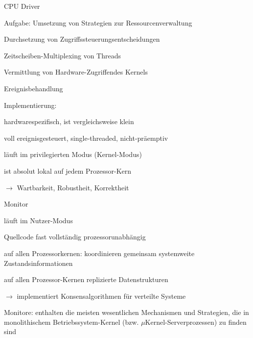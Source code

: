 \documentclass[a4paper]{article}
\begin{document}
\begin{multicols}{3}
    CPU Driver
    \begin{itemize*}
        \item Aufgabe: Umsetzung von Strategien zur Ressourcenverwaltung
        \begin{itemize*}
            \item Durchsetzung von Zugriffssteuerungsentscheidungen
            \item Zeitscheiben-Multiplexing von Threads
            \item Vermittlung von Hardware-Zugriffendes Kernels
            \item Ereignisbehandlung
        \end{itemize*}
        \item Implementierung:
        \begin{itemize*}
            \item hardwarespezifisch, ist vergleichsweise klein %
            \item voll ereignisgesteuert, single-threaded, nicht-präemptiv
            \item läuft im privilegierten Modus (Kernel-Modus)
            \item ist absolut lokal auf jedem Prozessor-Kern %
            \item[$\rightarrow$] Wartbarkeit, Robustheit, Korrektheit
        \end{itemize*}
    \end{itemize*}

    Monitor
    \begin{itemize*}
            \item läuft im Nutzer-Modus
            \item Quellcode fast vollständig prozessorunabhängig
        \item auf allen Prozessorkernen: koordinieren gemeinsam systemweite Zustandsinformationen
        \begin{itemize*}
            \item auf allen Prozessor-Kernen replizierte Datenstrukturen%
            \item[$\rightarrow$] implementiert Konsensalgorithmen für verteilte Systeme
        \end{itemize*}
        \item Monitore: enthalten die meisten wesentlichen Mechanismen und Strategien, die in monolithischem Betriebssystem-Kernel (bzw. $\mu$Kernel-Serverprozessen) zu finden sind
    \end{itemize*}


\end{multicols}
\end{document}
